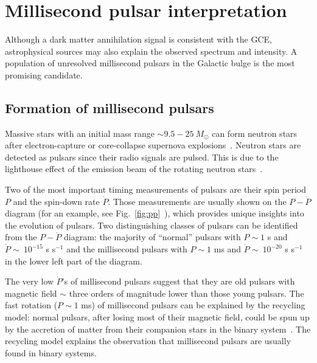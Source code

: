 \documentclass[doublespace,nopageskip]{VTthesis} %
\begin{document}

\section{Millisecond pulsar interpretation}

Although a dark matter annihilation signal is consistent with the GCE,  astrophysical sources may also explain the observed spectrum and intensity. A population of unresolved millisecond pulsars in the Galactic bulge is the most promising candidate.

\subsection{Formation of millisecond pulsars}

Massive stars with an initial mass range $\sim 9.5 - 25\ M_\odot$ can form neutron stars after electron-capture or core-collapse supernova explosions~\cite{2014PASA...31...30K}. Neutron stars are detected as pulsars since their radio signals are pulsed. This is due to the lighthouse effect of the emission beam of the rotating neutron stars~\cite{2004hpa..book.....L}.

Two of the most important timing measurements of pulsars are their spin period $P$ and the spin-down rate $\dot{P}$. Those measurements are usually shown on the $P-\dot{P}$ diagram (for an example, see Fig.~\ref{fig:pp}~\cite{2011AIPC.1357..269T,2005AJ....129.1993M}), which provides unique insights into the evolution of pulsars. Two distinguishing classes of pulsars can be identified from the $P-\dot{P}$ diagram: the majority of ``normal'' pulsars with $P \sim 1$ s and $\dot{P} \sim\ 10^{-15}$ s s$^{-1}$ and the millisecond pulsars  with $P \sim 1$ ms and $\dot{P} \sim\ 10^{-20}$ s s$^{-1}$ in the lower left part of the diagram.

The very low $\dot{P}$'s of millisecond pulsars suggest that they are old pulsars with magnetic field $\sim$ three orders of magnitude lower than those young pulsars. The fast rotation ($P \sim 1$ ms) of millisecond pulsars can be explained by the recycling model: normal pulsars, after losing most of their magnetic field, could be spun up by the accretion of matter from their companion stars in the binary system~\cite{1982Natur.300..728A,1998Natur.394..344W}. The recycling model explains the observation that millisecond pulsars are usually found in binary systems.
\end{document}
